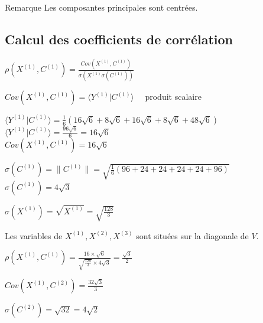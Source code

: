\documentclass[a4paper, 12pt]{article}
\begin{document}
\begin{remarque}{Remarque}
Les composantes principales sont centrées.
\end{remarque}

\subsection{Calcul des coefficients de corrélation}
\begin{center}
$\rho (X^{(1)}, C^{(1)}) = \frac{Cov(X^{(1)}, C^{(1)})}{\sigma (X^{(1)} \sigma (C^{(1)}))}$
\end{center}

\begin{flushleft}
$Cov (X^{(1)}, C^{(1)}) = \langle Y^{(1)} | C^{(1)} \rangle \quad$ produit scalaire
\end{flushleft}

\begin{center}
$\langle Y^{(1)} | C^{(1)} \rangle = \frac{1}{6} (16 \sqrt{6} + 8 \sqrt{6} + 16 \sqrt{6} + 8 \sqrt{6} + 48 \sqrt{6})$ \\
$\langle Y^{(1)} | C^{(1)} \rangle = \frac{96 \sqrt{6}}{6} = 16 \sqrt{6}$ \\
$Cov (X^{(1)}, C^{(1)}) = 16 \sqrt{6}$
\end{center}

\begin{center}
$\sigma (C^{(1)}) = \| C^{(1)} \| = \sqrt{\frac{1}{6} (96 + 24 + 24 + 24 + 24 + 96)}$ \\
$\sigma (C^{(1)}) = 4 \sqrt{3}$
\end{center}

\begin{center}
$\sigma (X^{(1)}) = \sqrt{X^{(1)}} = \sqrt{\frac{128}{3}}$
\end{center}

Les variables de $X^{(1)}, X^{(2)}, X^{(3)}$ sont situées sur la diagonale de $V$.

\begin{center}
$\rho (X^{(1)}, C^{(1)}) = \frac{16 \times \sqrt{6}}{\sqrt{\frac{128}{3}} \times 4 \sqrt{3}} = \boxed{\frac{\sqrt{3}}{2}}$
\end{center}

\begin{center}
$Cov (X^{(1)}, C^{(2)}) = \frac{32 \sqrt{3}}{3}$
\end{center}

\begin{center}
$\sigma (C^{(2)}) = \sqrt{32} = 4 \sqrt{2}$
\end{center}
\end{document}
